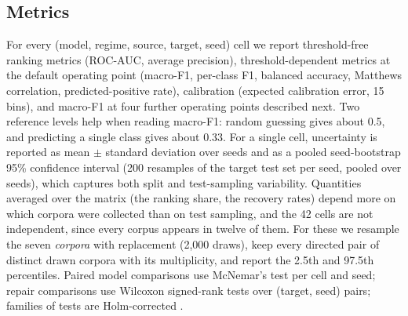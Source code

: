 \subsection{Metrics}\label{sec:metrics}
For every (model, regime, source, target, seed) cell we report threshold-free ranking metrics (ROC-AUC, average precision), threshold-dependent metrics at the default operating point (macro-F1, per-class F1, balanced accuracy, Matthews correlation, predicted-positive rate), calibration (expected calibration error, 15 bins), and macro-F1 at four further operating points described next. Two reference levels help when reading macro-F1: random guessing gives about 0.5, and predicting a single class gives about 0.33. For a single cell, uncertainty is reported as mean $\pm$ standard deviation over seeds and as a pooled seed-bootstrap 95\% confidence interval (200 resamples of the target test set per seed, pooled over seeds), which captures both split and test-sampling variability. Quantities averaged over the matrix (the ranking share, the recovery rates) depend more on which corpora were collected than on test sampling, and the 42 cells are not independent, since every corpus appears in twelve of them. For these we resample the seven \emph{corpora} with replacement (2{,}000 draws), keep every directed pair of distinct drawn corpora with its multiplicity, and report the 2.5th and 97.5th percentiles. Paired model comparisons use McNemar's test \citep{mcnemar1947note} per cell and seed; repair comparisons use Wilcoxon signed-rank tests over (target, seed) pairs; families of tests are Holm-corrected \citep{holm1979simple}.

